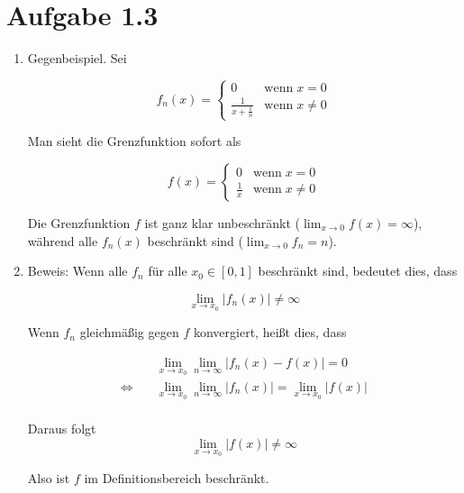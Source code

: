 \documentclass[a4paper,german,12pt,smallheadings]{scrartcl}
\begin{document}
\section*{Aufgabe 1.3}
\begin{enumerate}[(1)]
\item Gegenbeispiel. Sei

\begin{equation*}
  f_n(x) = \begin{cases} 
    0           & \mbox{wenn} \; x = 0 \\
    \frac{1}{x + \frac{1}{n}} & \mbox{wenn} \; x \neq 0
  \end{cases}
\end{equation*}


Man sieht die Grenzfunktion sofort als

\begin{equation*}
  f(x) = \begin{cases} 
    0           & \mbox{wenn} \; x = 0 \\
    \frac{1}{x} & \mbox{wenn} \; x \neq 0
  \end{cases}
\end{equation*}

Die Grenzfunktion $f$ ist ganz klar unbeschränkt ($\lim_{x \to 0} f(x) = \infty$), während alle $f_n(x)$ beschränkt sind ($\lim_{x \to 0} f_n = n$).

\item
  Beweis: Wenn alle $f_n$ für alle $x_0 \in [0,1]$ beschränkt sind, bedeutet dies, dass

  \begin{equation*}
    \lim_{x \to x_0} |f_n(x)| \neq \infty
  \end{equation*}

  Wenn $f_n$ gleichmäßig gegen $f$ konvergiert, heißt dies, dass

  \begin{align*}
    &\quad \lim_{x \to x_0} \lim_{n \to \infty} |f_n(x) - f(x)| = 0 \\
    \Leftrightarrow&\quad \lim_{x \to x_0} \lim_{n \to \infty} |f_n(x)| = \lim_{x \to x_0} |f(x)| \\
  \end{align*}

  Daraus folgt
  \begin{equation*}
    \lim_{x \to x_0} |f(x)| \neq \infty
  \end{equation*}

  Also ist $f$ im Definitionsbereich beschränkt.
\end{enumerate}
\end{document}
